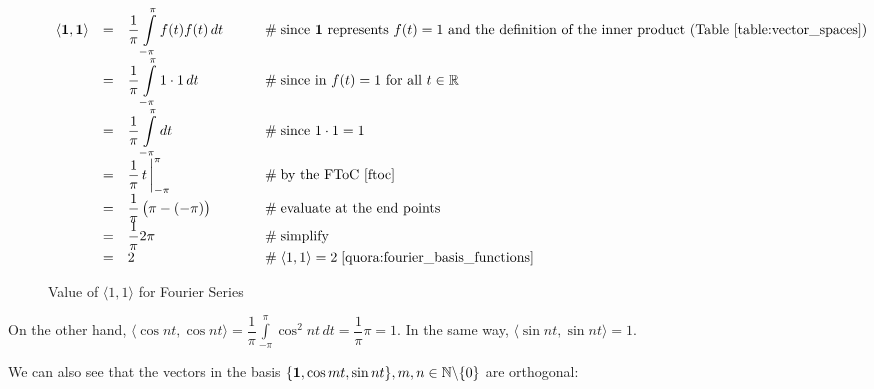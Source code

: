 \documentclass{article}
\theoremstyle{definition}
\begin{document}
\bigskip
\begin{figure}[H]
   {								%
    \begin{math}
      \begin{array}{llll}
        \langle {\bf 1},{\bf 1} \rangle
        &=& {\displaystyle \frac{1}{\pi}\int\limits_{-\pi}^{\pi} f(t) f(t) \, dt}
     	   &\hspace{2em} \mathrel{\#} \text{since {\bf 1} represents $f(t) = 1$ and the 
										 definition of the inner product 
										 (Table \ref{table:vector_spaces})} \\
        &=& {\displaystyle \frac{1}{\pi}\int\limits_{-\pi}^{\pi} 1 \cdot 1 \, dt}
     	   &\hspace{2em} \mathrel{\#} \text{since in $f(t) = 1$ for all 
										 $t \in \mathbb{R}$} \\
	   &=& {\displaystyle \frac{1}{\pi}\int\limits_{-\pi}^{\pi} dt}
	  	   &\hspace{2em} \mathrel{\#} \text{since $1 \cdot 1 = 1$} \\
	   &=& {\displaystyle \frac{1}{\pi}  \, t \, \bigg |^{\pi}_{-\pi}}
		   &\hspace{2em} \mathrel{\#} \text{by the FToC \cite{ftoc}} \\
	   &=& {\displaystyle \frac{1}{\pi} \left (\pi - (-\pi) \right )}
		   &\hspace{2em} \mathrel{\#} \text{evaluate at the end points} \\
	   &=& {\displaystyle \frac{1}{\pi} 2\pi}
		   &\hspace{2em} \mathrel{\#} \text{simplify} \\
	   &=& {\displaystyle 2}
		   &\hspace{2em} \mathrel{\#} \langle 1,1 \rangle = 2 \; 
								   \cite{quora:fourier_basis_functions}
     \end{array}
   \end{math}
 }
 \caption{Value of $\langle 1,1 \rangle$ for Fourier Series}
 \label{figure:fourier_inner_product}
\end{figure}

\bigskip
\noindent
On the other hand, $\langle \cos nt, \cos nt \rangle =
{\displaystyle \dfrac{1}{\pi} \int\limits_{-\pi}^{\pi} \cos^2 nt
\,dt = \dfrac{1}{\pi} \pi = 1}$. In the same way, $\langle \sin
nt, \sin nt \rangle = 1$.
  
 
\bigskip
\noindent
 We can also see that the vectors in the basis $\{{\bf 1}, \cos mt,
 \sin nt\}, m,n \in \mathbb{N}\backslash\{0\}$ are 
 orthogonal:
 
\end{document}
